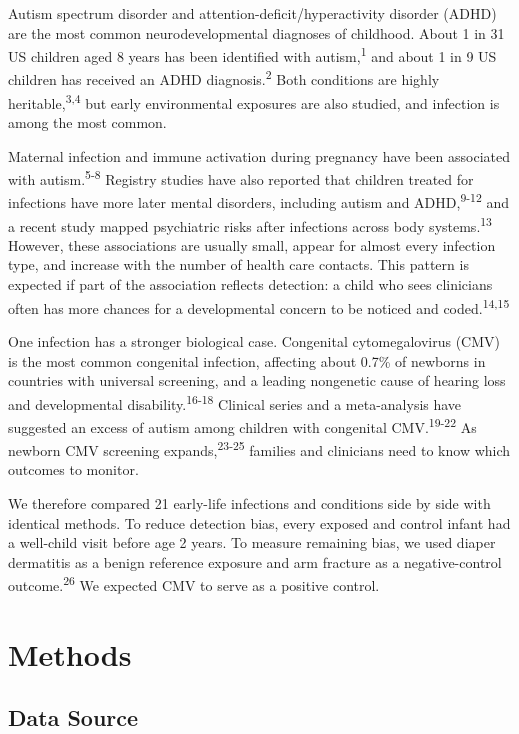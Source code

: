 \documentclass[11pt]{article}
\begin{document}
Autism spectrum disorder and attention-deficit/hyperactivity disorder (ADHD) are the most common neurodevelopmental diagnoses of childhood. About 1 in 31 US children aged 8 years has been identified
with autism,\textsuperscript{1} and about 1 in 9 US children has received an ADHD diagnosis.\textsuperscript{2} Both conditions are highly heritable,\textsuperscript{3,4} but early environmental
exposures are also studied, and infection is among the most common.

Maternal infection and immune activation during pregnancy have been associated with autism.\textsuperscript{5-8} Registry studies have also reported that children treated for infections have more
later mental disorders, including autism and ADHD,\textsuperscript{9-12} and a recent study mapped psychiatric risks after infections across body systems.\textsuperscript{13} However, these
associations are usually small, appear for almost every infection type, and increase with the number of health care contacts. This pattern is expected if part of the association reflects detection: a
child who sees clinicians often has more chances for a developmental concern to be noticed and coded.\textsuperscript{14,15}

One infection has a stronger biological case. Congenital cytomegalovirus (CMV) is the most common congenital infection, affecting about 0.7\% of newborns in countries with universal screening, and a
leading nongenetic cause of hearing loss and developmental disability.\textsuperscript{16-18} Clinical series and a meta-analysis have suggested an excess of autism among children with congenital
CMV.\textsuperscript{19-22} As newborn CMV screening expands,\textsuperscript{23-25} families and clinicians need to know which outcomes to monitor.

We therefore compared 21 early-life infections and conditions side by side with identical methods. To reduce detection bias, every exposed and control infant had a well-child visit before age 2 years.
To measure remaining bias, we used diaper dermatitis as a benign reference exposure and arm fracture as a negative-control outcome.\textsuperscript{26} We expected CMV to serve as a positive control.

\hypertarget{methods}{%
\section*{Methods}\label{methods}}

\hypertarget{data-source}{%
\subsection*{Data Source}\label{data-source}}
\end{document}
